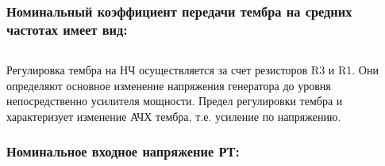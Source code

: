  \begin{equation}
  \label{eq:equation5_16}
  
  \end{equation}

  \begin{equation}
  \label{eq:equation5_17}
  
  \end{equation}

  \subsubsection{ Номинальный коэффициент передачи тембра на средних частотах имеет вид:}
   
  \begin{equation}
  \label{eq:equation5_18}
   
  \end{equation}

  Регулировка тембра на НЧ осуществляется за счет резисторов R3 и R1. Они определяют основное изменение напряжения генератора до уровня непосредственно усилителя мощности. Предел регулировки тембра и характеризует изменение АЧХ тембра, т.е. усиление по напряжению.

  \subsubsection{  Номинальное входное напряжение РТ:}

  \begin{equation}
  \label{eq:equation5_19}
   
  \end{equation}


   
